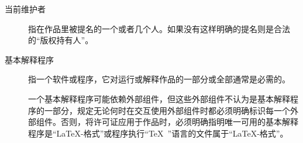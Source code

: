 \begin{LPPLicense}
\begin{description}
        \item[当前维护者] 指在作品里被提名的一个或者几个人。如果没有这样明确的提名则是合法的``版权持有人''。
        \item[基本解释程序] 指一个软件或程序，它对运行或解释作品的一部分或全部通常是必需的。


            一个基本解释程序可能依赖外部组件，但这些外部组件不认为是基本解释程 序的一部分，规定无论何时在交互使用外部组件时都必须明确标识每一个外部组件。否则，将许可证应用于作品时，必须明确指明唯一可用的基本解释程序是``\LaTeX-格式''或程序执行``\TeX\ ''语言的文件属于``\LaTeX-格式''。
    \end{description}


    \label{LPPL:Conditions}


\end{LPPLicense}
